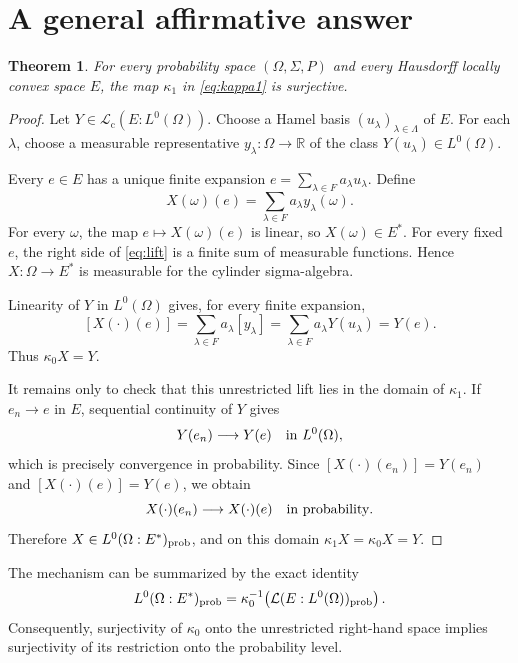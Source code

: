 \documentclass[11pt]{article}
\newtheorem{theorem}{Theorem}
\newcommand{\Om}{\Omega}
\newcommand{\R}{\mathbb R}
\newcommand{\Ealg}{E^{\ast}}
\newcommand{\Lzero}{L^0}
\newcommand{\Lc}{\mathcal L_{\mathrm c}}
\newcommand{\Lin}{\mathcal L}
\begin{document}
\section{A general affirmative answer}

\begin{theorem}\label{thm:main}
For every probability space $(\Om,\Sigma,P)$ and every Hausdorff locally
convex space $E$, the map $\kappa_1$ in \eqref{eq:kappa1} is surjective.
\end{theorem}

\begin{proof}
Let $Y\in\Lc(E:\Lzero(\Om))$.  Choose a Hamel basis
$(u_\lambda)_{\lambda\in\Lambda}$ of $E$.  For each $\lambda$, choose a
measurable representative $y_\lambda:\Om\to\R$ of the class
$Y(u_\lambda)\in\Lzero(\Om)$.

Every $e\in E$ has a unique finite expansion
$e=\sum_{\lambda\in F}a_\lambda u_\lambda$.  Define
\begin{equation}\label{eq:lift}
 X(\omega)(e)=\sum_{\lambda\in F}a_\lambda y_\lambda(\omega).
\end{equation}
For every $\omega$, the map $e\mapsto X(\omega)(e)$ is linear, so
$X(\omega)\in\Ealg$.  For every fixed $e$, the right side of
\eqref{eq:lift} is a finite sum of measurable functions.  Hence
$X:\Om\to\Ealg$ is measurable for the cylinder sigma-algebra.

Linearity of $Y$ in $\Lzero(\Om)$ gives, for every finite expansion,
\[
 [X(\mathord\cdot)(e)]
 =\sum_{\lambda\in F}a_\lambda [y_\lambda]
 =\sum_{\lambda\in F}a_\lambda Y(u_\lambda)
 =Y(e).
\]
Thus $\kappa_0X=Y$.

It remains only to check that this unrestricted lift lies in the domain of
$\kappa_1$.  If $e_n\to e$ in $E$, sequential continuity of $Y$ gives
\[
 Y(e_n)\longrightarrow Y(e)\quad\hbox{in }\Lzero(\Om),
\]
which is precisely convergence in probability.  Since
$[X(\mathord\cdot)(e_n)]=Y(e_n)$ and
$[X(\mathord\cdot)(e)]=Y(e)$, we obtain
\[
 X(\mathord\cdot)(e_n)\longrightarrow X(\mathord\cdot)(e)
 \quad\hbox{in probability}.
\]
Therefore $X\in\Lzero(\Om:\Ealg)_{\rm prob}$, and on this domain
$\kappa_1X=\kappa_0X=Y$.
\end{proof}

The mechanism can be summarized by the exact identity
\begin{equation}\label{eq:preimage}
 \Lzero(\Om:\Ealg)_{\rm prob}
 =\kappa_0^{-1}\!\left(\Lin(E:\Lzero(\Om))_{\rm prob}\right).
\end{equation}
Consequently, surjectivity of $\kappa_0$ onto the unrestricted right-hand
space implies surjectivity of its restriction onto the probability level.
\end{document}
